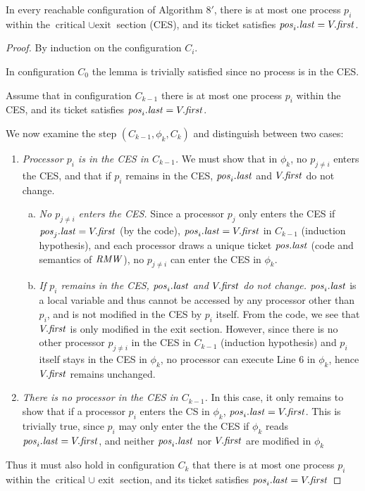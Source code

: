 \begin{lemma} \label{lemma:3.mutual_exclusion}
In every reachable configuration of Algorithm $8'$, there is at most one process
$p_i$ within the $\text{critical } \cup \text{exit}$ section (CES), and its ticket
satisfies $\mathit{pos}_i.\mathit{last} = V.\mathit{first}$.
\end{lemma}

\begin{proof}
By induction on the configuration $C_i$.

In configuration $C_0$ the lemma is trivially satisfied since no process is in
the CES.

Assume that in configuration $C_{k-1}$ there is at most one process
$p_i$ within the CES, and its ticket
satisfies $\mathit{pos}_i.\mathit{last} = V.\mathit{first}$.

We now examine the step $(C_{k-1}, \phi_k, C_k)$ and distinguish between two cases: 
\begin{enumerate}
\item \emph{Processor $p_i$ is in the CES in $C_{k-1}$.} We must show that in $\phi_k$,
      no $p_{j \neq i}$ enters the CES, and that if $p_i$
      remains in the CES, $\mathit{pos}_i.\mathit{last}$ and $V.\mathit{first}$ do not change.
      \begin{enumerate}[a)]
      \item \emph{No $p_{j \neq i}$ enters the CES.} 
            Since a processor $p_j$ only enters the CES
            if $\mathit{pos}_j.\mathit{last} = V.\mathit{first}$ (by the code),
            $\mathit{pos}_i.\mathit{last} = V.\mathit{first}$ in $C_{k-1}$ (induction hypothesis),
            and each processor draws a unique ticket $\mathit{pos}.\mathit{last}$ (code and
            semantics of $\mathit{RMW}$), no $p_{j \neq i}$ can enter the CES in $\phi_k$.
      \item \emph{If $p_i$ remains in the CES, $\mathit{pos}_i.\mathit{last}$ and $V.\mathit{first}$ 
            do not change.} $\mathit{pos}_i.\mathit{last}$ is a local variable and thus cannot
            be accessed by any processor other than $p_i$, and is not modified 
            in the CES by $p_i$ itself. From the code, we see that $V.\mathit{first}$
            is only modified in the exit section. However, since there is no
            other processor $p_{j \neq i}$ in the CES in $C_{k-1}$
            (induction hypothesis) and $p_i$ itself stays in the CES in $\phi_k$,
            no processor can execute Line 6 in $\phi_k$, hence $V.\mathit{first}$
            remains unchanged.            
      \end{enumerate}
\item \emph{There is no processor in the CES in $C_{k-1}$.}
      In this case, it only remains to show that if a processor $p_i$ enters
      the CS in $\phi_k$, $\mathit{pos}_i.\mathit{last} = V.\mathit{first}$. This is trivially true,
      since $p_i$ may only enter the the CES if $\phi_k$ reads
      $\mathit{pos}_i.\mathit{last} = V.\mathit{first}$, and neither $\mathit{pos}_i.\mathit{last}$ nor $V.\mathit{first}$
      are modified in $\phi_k$
\end{enumerate}
Thus it must also hold in configuration $C_k$ that there is at most one process
$p_i$ within the $\text{critical } \cup \text{ exit}$ section, and its ticket
satisfies $\mathit{pos}_i.\mathit{last} = V.\mathit{first}$
\end{proof}


